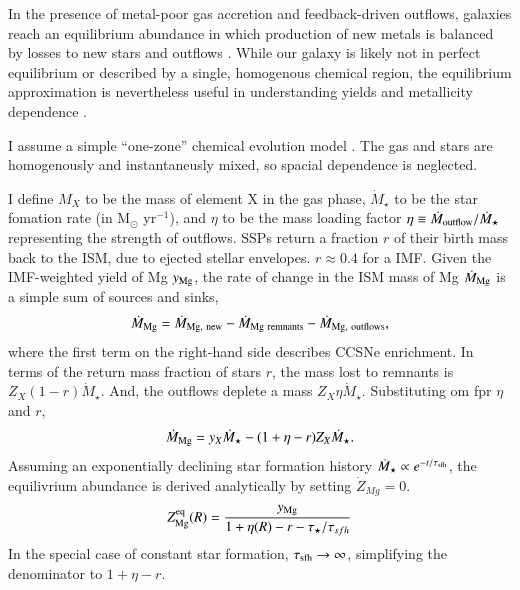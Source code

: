 \documentclass[12pt,oneside]{report}
\begin{document}
In the presence of metal-poor gas accretion and feedback-driven outflows, galaxies reach an equilibrium abundance in which production of new metals is balanced by losses to new stars and outflows \citep{larson72, dalcanton07, FD08, PS11, lilly13}.
While our galaxy is likely not in perfect equilibrium or described by a single, homogenous chemical region, the equilibrium approximation is nevertheless useful in understanding yields and metallicity dependence \citep[e.g.][]{james_dwarf,james+23,WAF17}. 

I assume a simple ``one-zone'' chemical evolution model \cite[e.g.][]{tinsley80, pagel09, matteucci21}.  The gas and stars are homogenously and instantaneusly mixed, so spacial dependence is neglected.

I define $M_{X}$ to be the mass of element X in the gas phase, $\dot{M}_\star$ to be the star fomation rate (in M$_\odot$ yr$^{-1}$), and $\eta$ to be the mass loading factor $\eta\equiv\dot{M}_{\rm outflow}/\dot{M}_\star$ representing the strength of outflows. 
SSPs return a fraction $r$ of their birth mass back to the ISM, due to ejected stellar envelopes. $r\approx0.4$ for a \citet{kroupa01} IMF.
Given the IMF-weighted yield of Mg $y_{\rm Mg}$, the rate of change in the ISM mass of Mg $\dot{M}_{\rm Mg}$ is a simple sum of sources and sinks,
\begin{equation}
    \dot{M}_{\rm Mg} = \dot{M}_{\rm Mg,~new} - \dot{M}_{\rm Mg~remnants} - \dot{M}_{\rm Mg,~outflows},
\end{equation}
where the first term on the right-hand side describes CCSNe enrichment. 
In terms of the return mass fraction of stars $r$, the mass lost to remnants is $Z_X (1-r)\dot{M}_\star$.  And, the outflows deplete a mass $Z_X \eta\dot{M}_\star$. Substituting om fpr $\eta$ and $r$,  
\begin{equation}
    \dot{M}_{\rm Mg}= y_{X} \dot{M}_\star - (1 + \eta - r) Z_{X} \dot{M}_\star.
\end{equation}
Assuming an exponentially declining star formation history $\dot{M}_\star \propto e^{-t/\tau_{\rm sfh}}$, the equilivrium abundance is derived analytically by setting $\dot{Z}_{Mg}=0$.
\begin{equation}\label{eq:z_eq}
    Z_{\rm Mg}^{\rm eq}(R) = \frac{y_{\rm Mg}}{1 + \eta(R) - r - \tau_\star / \tau_{sfh}}
\end{equation}
In the special case of constant star formation, $\tau_{\rm sfh}\to\infty$, simplifying the denominator to $1+\eta-r$.
\end{document}

